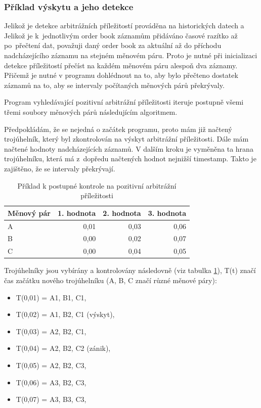 \documentclass[thesis=B,czech]{FITthesis}[2019/03/21]
\begin{document}
\subsubsection{Příklad výskytu a jeho detekce}
Jelikož je detekce arbitrážních příležitostí prováděna na historických datech a Jelikož je k~jednotlivým order book záznamům přidáváno časové razítko až po~přečtení dat, považuji daný order book za aktuální až do příchodu nadcházejícího záznamu na stejném měnovém páru. Proto je nutné při inicializaci detekce příležitostí přečíst na každém měnovém páru alespoň dva záznamy. Přičemž je nutné v programu dohlédnout na to, aby bylo přečteno dostatek záznamů na to, aby se intervaly počítaných měnových párů překrývaly. 

Program vyhledávající pozitivní arbitrážní příležitosti iteruje postupně všemi třemi soubory měnových párů následujícím algoritmem. 

Předpokládám, že se nejedná o začátek programu, proto mám již načtený trojúhelník, který byl zkontrolován na výskyt arbitrážní příležitosti. Dále mám načtené hodnoty nadcházejících záznamů. V dalším kroku je vyměněna ta hrana trojúhelníku, která má z~dopředu načtených hodnot nejnižší timestamp. Takto je zajištěno, že se intervaly překrývají. 

\begin{table}\centering
\caption{Příklad k postupné kontrole na pozitivní arbitrážní příležitosti}
\label{timestamp_example}
\begin{tabular}{|| l | r | r | r ||}\hline Měnový pár & 1. hodnota & 2. hodnota & 3. hodnota\\ [0.5ex]
 \hline
 \hline A & 0,01 & 0,03 & 0,06\\ 
 \hline B & 0,00 & 0,02 & 0,07\\ 
 \hline C & 0,00 & 0,04 & 0,05\\ 
 \hline
\end{tabular}
\end{table}

Trojúhelníky jsou vybírány a kontrolovány následovně (viz tabulka \ref{timestamp_example}), T(t) značí čas začátku nového trojúhelníku (A, B, C značí různé měnové páry):
\begin{itemize}
    \item T(0,01) = A1, B1, C1,
    \item T(0,02) = A1, B2, C1 (výskyt),
    \item T(0,03) = A2, B2, C1,
    \item T(0,04) = A2, B2, C2 (zánik),
    \item T(0,05) = A2, B2, C3,
    \item T(0,06) = A3, B2, C3,
    \item T(0,07) = A3, B3, C3,
\end{itemize}
\end{document}
